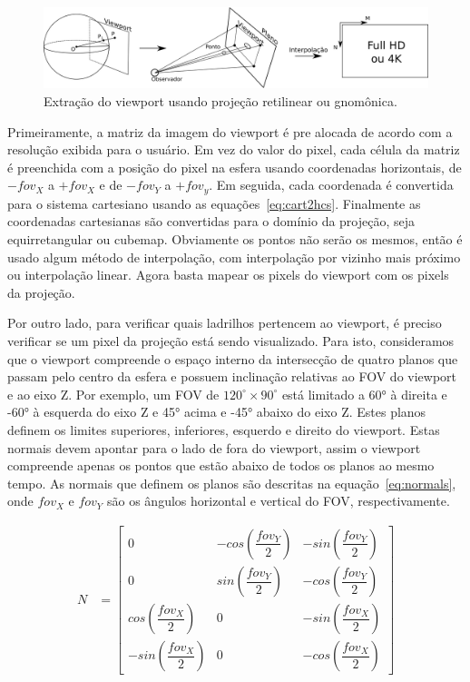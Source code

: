 \begin{figure}[htb]
        \centering
        \includegraphics[width=1.0\linewidth]{fig/projecao_viewport.png}
        \caption{Extração do viewport usando projeção retilinear ou gnomônica.}
        \label{fig:projecao_viewport}
\end{figure}

Primeiramente, a matriz da imagem do viewport é pre alocada de acordo com a resolução exibida para o usuário. Em vez do valor do pixel, cada célula da matriz é preenchida com a posição do pixel na esfera usando coordenadas horizontais, de $-fov_X$ a $+fov_X$ e de $-fov_Y$ a $+fov_y$. Em seguida, cada coordenada é convertida para o sistema cartesiano usando as equações~\ref{eq:cart2hcs}. Finalmente as coordenadas cartesianas são convertidas para o domínio da projeção, seja equirretangular ou cubemap. Obviamente os pontos não serão os mesmos, então é usado algum método de interpolação, com interpolação por vizinho mais próximo ou interpolação linear. Agora basta mapear os pixels do viewport com os pixels da projeção.

Por outro lado, para verificar quais ladrilhos pertencem ao viewport, é preciso verificar se um pixel da projeção está sendo visualizado. Para isto, consideramos que o viewport compreende o espaço interno da intersecção de quatro planos que passam pelo centro da esfera e possuem inclinação relativas ao FOV do viewport e ao eixo Z. Por exemplo, um FOV de $ 120^\circ\times 90^\circ $ está limitado a 60° à direita e -60° à esquerda do eixo Z e 45° acima e -45° abaixo do eixo Z. Estes planos definem os limites superiores, inferiores, esquerdo e direito do viewport. Estas normais devem apontar para o lado de fora do viewport, assim o viewport compreende apenas os pontos que estão abaixo de todos os planos ao mesmo tempo. As normais que definem os planos são descritas na equação~\ref{eq:normals}, onde $fov_X$ e $fov_Y$ são os ângulos horizontal e vertical do FOV, respectivamente.

\begin{align}
        N &=\begin{bmatrix}
                0 & -cos\left(\dfrac{fov_Y}{2}\right) & -sin\left(\dfrac{fov_Y}{2}\right) \\
                0 & sin\left(\dfrac{fov_Y}{2}\right) & -cos\left(\dfrac{fov_Y}{2}\right) \\
                cos\left(\dfrac{fov_X}{2}\right) & 0 & -sin\left(\dfrac{fov_X}{2}\right)\\
                -sin\left(\dfrac{fov_X}{2}\right) & 0 & -cos\left(\dfrac{fov_X}{2}\right)
        \end{bmatrix}
        \label{eq:normals}
\end{align}


